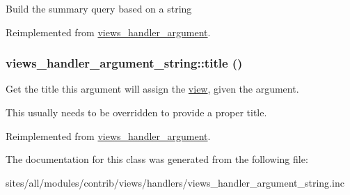 Build the summary query based on a string 

Reimplemented from \hyperlink{classviews__handler__argument_1dd6cc301b1c7c1c6829c59eb641a883}{views\_\-handler\_\-argument}.\hypertarget{classviews__handler__argument__string_bd176c527d765826b51c50346309b545}{
\subsubsection[{title}]{\setlength{\rightskip}{0pt plus 5cm}views\_\-handler\_\-argument\_\-string::title ()}}
\label{classviews__handler__argument__string_bd176c527d765826b51c50346309b545}


Get the title this argument will assign the \hyperlink{classview}{view}, given the argument.

This usually needs to be overridden to provide a proper title. 

Reimplemented from \hyperlink{classviews__handler__argument_76181ac24e7be4a09aaafc1fa5f15ea1}{views\_\-handler\_\-argument}.

The documentation for this class was generated from the following file:\begin{CompactItemize}
\item 
sites/all/modules/contrib/views/handlers/views\_\-handler\_\-argument\_\-string.inc\end{CompactItemize}
